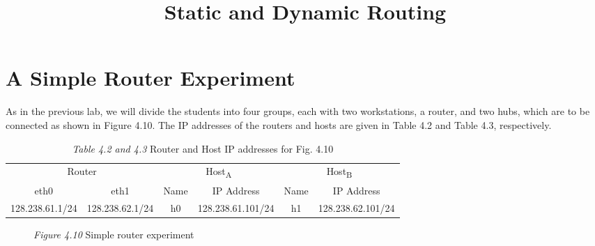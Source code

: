 \documentclass{../UTNetLab}
\title{Static and Dynamic Routing}
\begin{document}
\part{A Simple Router Experiment}
    As in the previous lab, we will divide the students into four groups, each with two workstations, a router, and two hubs, which are to be connected as shown in Figure 4.10.
    The IP addresses of the routers and hosts are given in Table 4.2 and Table 4.3, respectively.
    \begin{table}[H]
        \caption{\textit{Table 4.2 and 4.3} Router and Host IP addresses for Fig. 4.10}
        \centering
        \begin{tabular}{ *2c | *2c | *2c }
            \hline \hline
            \multicolumn{2}{c|}{Router} & \multicolumn{2}{c|}{Host\textsubscript{A}} & \multicolumn{2}{c}{Host\textsubscript{B}} \\
            eth0 & eth1 & Name & IP Address & Name & IP Address \\
            \hline 
            128.238.61.1/24 & 128.238.62.1/24 & h0 & 128.238.61.101/24 & h1 & 128.238.62.101/24 \\
            \hline \hline
            \end{tabular}
    \end{table}

    \begin{figure}[H]
        \centering
        \caption{\textit{Figure 4.10} Simple router experiment}
    \end{figure}
\end{document}
